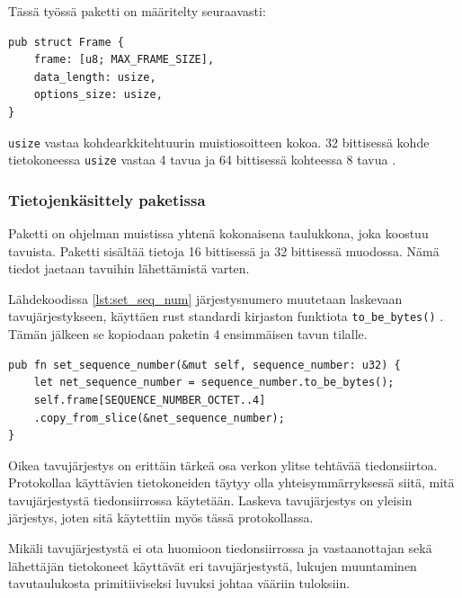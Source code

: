 \documentclass[a4paper,12pt]{article}
\begin{document}
    Tässä työssä paketti on määritelty seuraavasti:
    \begin{lstlisting}[caption={Paketin rakenne}, label={lst:frame}]
pub struct Frame {
    frame: [u8; MAX_FRAME_SIZE],
    data_length: usize,
    options_size: usize,
}\end{lstlisting}


    
   \begin{framed}
        \lstinline{usize} vastaa kohdearkkitehtuurin muistiosoitteen kokoa. 32 bittisessä kohde tietokoneessa \lstinline{usize} vastaa 4 tavua ja 64 bittisessä kohteessa 8 tavua \cite{rust-doc-usize}.
   \end{framed} 
   
    \subsubsection{Tietojenkäsittely paketissa}
    Paketti on ohjelman muistissa yhtenä kokonaisena taulukkona, joka koostuu tavuista.
    Paketti sisältää tietoja 16 bittisessä ja 32 bittisessä muodossa. Nämä tiedot jaetaan tavuihin lähettämistä varten.

    Lähdekoodissa \ref{lst:set_seq_num} järjestysnumero muutetaan laskevaan tavujärjestykseen, käyttäen rust standardi kirjaston funktiota \lstinline{to_be_bytes()} \cite{rust_doc_u32}. Tämän jälkeen se kopiodaan paketin 4 ensimmäisen tavun tilalle. \par
    
        \begin{lstlisting}[caption={Järjestusnumeron asettaminen pakettiin}, label={lst:set_seq_num}]
pub fn set_sequence_number(&mut self, sequence_number: u32) {
    let net_sequence_number = sequence_number.to_be_bytes();
    self.frame[SEQUENCE_NUMBER_OCTET..4]
    .copy_from_slice(&net_sequence_number);
}\end{lstlisting}


    Oikea tavujärjestys on erittäin tärkeä osa verkon ylitse tehtävää tiedonsiirtoa. Protokollaa käyttävien tietokoneiden täytyy olla yhteisymmärryksessä siitä, mitä tavujärjestystä tiedonsiirrossa käytetään. Laskeva tavujärjestys on yleisin järjestys, joten sitä käytettiin myös tässä protokollassa. \par
    
    Mikäli tavujärjestystä ei ota huomioon tiedonsiirrossa ja vastaanottajan sekä lähettäjän tietokoneet käyttävät eri tavujärjestystä, lukujen muuntaminen tavutaulukosta primitiiviseksi luvuksi johtaa vääriin tuloksiin.
    \cite{Adiga2007HowC}
\end{document}
